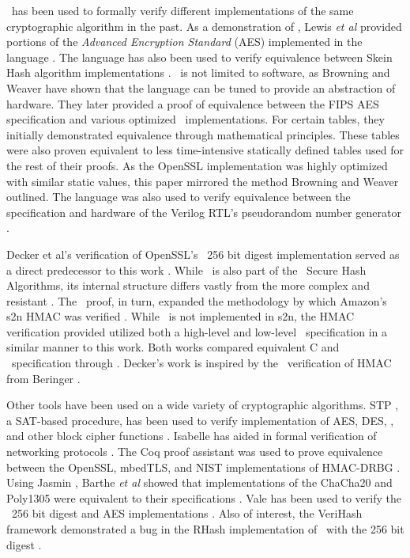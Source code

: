 \cryptol\ has been used to formally verify different implementations of the same cryptographic algorithm in the past.
As a demonstration of \cryptol, Lewis \emph{et al} provided portions of the \emph{Advanced Encryption Standard} (AES) implemented in the language \cite{crypt-hi}.
The language has also been used to verify equivalence between Skein Hash algorithm implementations \cite{hard-soft}.
\cryptol\ is not limited to software, as Browning and Weaver \cite{design-verif} have shown that the language can be tuned to provide an abstraction of hardware.
They later provided a proof of equivalence between the FIPS AES specification and various optimized \cryptol\ implementations.
For certain tables, they initially demonstrated equivalence through mathematical principles.
These tables were also proven equivalent to less time-intensive statically defined tables used for the rest of their proofs.
As the OpenSSL implementation was highly optimized with similar static values, this paper mirrored the method Browning and Weaver outlined.
The language was also used to verify equivalence between the specification and hardware of the Verilog RTL's pseudorandom number generator \cite{pseudorandom}.

Decker et al's verification of OpenSSL's \shaTwo\ 256 bit digest implementation served as a direct predecessor to this work \cite{nfm-us}.
While \shaTwo\ is also part of the \nist\ Secure Hash Algorithms, its internal structure differs vastly from the more complex and resistant \shaThree.
The \shaTwo\ proof, in turn, expanded the methodology by which Amazon's s2n HMAC was verified \cite{chudnov,s2n-blog}.
While \shaThree\ is not implemented in s2n, the HMAC verification provided utilized both a high-level and low-level \cryptol\ specification in a similar manner to this work.
Both works compared equivalent C and \cryptol\ specification through \saw.
Decker's work is inspired by the \openssl\ verification of HMAC from Beringer \cite{beringer}.

Other tools have been used on a wide variety of cryptographic algorithms.
STP \cite{stp}, a SAT-based procedure, has been used to verify implementation of AES, DES, \shaOne, and other block cipher functions \cite{auto}.
Isabelle has aided in formal verification of networking protocols \cite{isabelle,formal-protocols}.
The Coq proof assistant was used to prove equivalence between the OpenSSL, mbedTLS, and NIST implementations of HMAC-DRBG \cite{coq,verified-correctness}.
Using Jasmin \cite{jasmin}, Barthe \emph{et al} showed that implementations of the ChaCha20 and Poly1305 were equivalent to their specifications \cite{hi-assurance}.
Vale has been used to verify the \shaTwo\ 256 bit digest and AES implementations \cite{vale}.
Also of interest, the VeriHash framework demonstrated a bug in the RHash implementation of \shaThree\ with the 256 bit digest \cite{rhash,hash-functions}.
